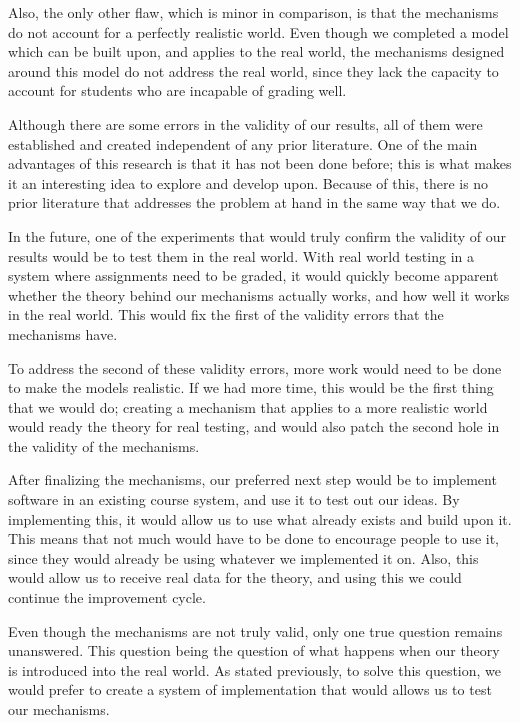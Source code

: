 \documentclass[12pt, Arial]{article}
\begin{document}
Also, the only other flaw, which is minor in comparison, is that the mechanisms do not account for a perfectly realistic world. Even though we completed a model which can be built upon, and applies to the real world, the mechanisms designed around this model do not address the real world, since they lack the capacity to account for students who are incapable of grading well.

Although there are some errors in the validity of our results, all of them were established and created independent of any prior literature. One of the main advantages of this research is that it has not been done before; this is what makes it an interesting idea to explore and develop upon. Because of this, there is no prior literature that addresses the problem at hand in the same way that we do.

In the future, one of the experiments that would truly confirm the validity of our results would be to test them in the real world. With real world testing in a system where assignments need to be graded, it would quickly become apparent whether the theory behind our mechanisms actually works, and how well it works in the real world. This would fix the first of the validity errors that the mechanisms have.

To address the second of these validity errors, more work would need to be done to make the models realistic. If we had more time, this would be the first thing that we would do; creating a mechanism that applies to a more realistic world would ready the theory for real testing, and would also patch the second hole in the validity of the mechanisms.

After finalizing the mechanisms, our preferred next step would be to implement software in an existing course system, and use it to test out our ideas. By implementing this, it would allow us to use what already exists and build upon it. This means that not much would have to be done to encourage people to use it, since they would already be using whatever we implemented it on. Also, this would allow us to receive real data for the theory, and using this we could continue the improvement cycle.

Even though the mechanisms are not truly valid, only one true question remains unanswered. This question being the question of what happens when our theory is introduced into the real world. As stated previously, to solve this question, we would prefer to create a system of implementation that would allows us to test our mechanisms.
\newpage
{}

\end{document}
